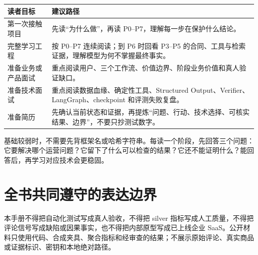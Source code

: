 \begin{tabularx}{0.94\linewidth}{>{\raggedright\arraybackslash}p{}X}
\toprule
读者目标 & 建议路径 \\
\midrule
第一次接触项目 & 先读“为什么做”，再读 P0--P7，理解每一步在保护什么结论。 \\
完整学习工程 & 按 P0--P7 连续阅读；到 P6 时回看 P3--P5 的合同、工具与检索证据，理解模型为何不掌握最终事实。 \\
准备业务或产品面试 & 重点阅读用户、三个工作流、价值边界、阶段业务价值和真人验证缺口。 \\
准备技术面试 & 重点阅读数据血缘、确定性工具、Structured Output、Verifier、LangGraph、checkpoint 和评测失败复盘。 \\
准备简历 & 先确认当前状态和证据，再提炼“问题、行动、技术选择、可核实结果、边界”，不要只抄测试数字。 \\
\bottomrule
\end{tabularx}

\begin{advicebox}
基础较弱时，不需要先背框架名或哈希字符串。每读一个阶段，先回答三个问题：它要解决哪个运营问题？它留下了什么可以检查的结果？它还不能证明什么？能回答后，再学习对应技术会更稳固。
\end{advicebox}

\section{全书共同遵守的表达边界}

\begin{boundarybox}
本手册不得把自动化测试写成真人验收，不得把 silver 指标写成人工质量，不得把评论信号写成缺陷或因果事实，也不得把内部原型写成已上线企业 SaaS。公开材料只使用代码、合成夹具、聚合指标和经审查的结果；不展示原始评论、真实商品或证据标识、密钥和本地绝对路径。
\end{boundarybox}
